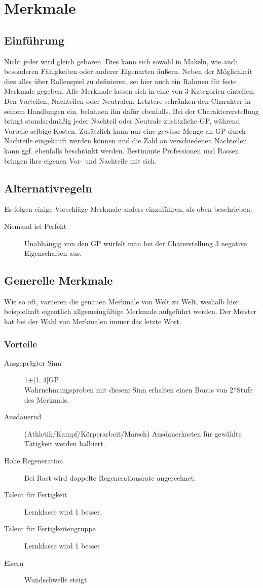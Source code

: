 \documentclass[a4paper,12pt,oneside]{book}
\begin{document}
\chapter{Merkmale}
\section{Einführung}
Nicht jeder wird gleich geboren. Dies kann sich sowohl in Makeln, wie auch besonderen Fähigkeiten oder anderer Eigenarten äußern. Neben der Möglichkeit dies alles über Rollenspiel zu definieren, sei hier auch ein Rahmen für feste Merkmale gegeben. Alle Merkmale lassen sich in eine von 3 Kategorien einteilen: Den Vorteilen, Nachteilen oder Neutralen. Letztere schränken den Charakter in seinem Handlungen ein, belohnen ihn dafür ebenfalls. Bei der Charaktererstellung bringt standardmäßig jeder Nachteil oder Neutrale zusätzliche GP, während Vorteile selbige Kosten. Zusätzlich kann nur eine gewisse Menge an GP durch Nachteile eingekauft werden können und die Zahl an verschiedenen Nachteilen kann ggf. ebenfalls beschränkt werden. Bestimmte Professionen und Rassen bringen ihre eigenen Vor- und Nachteile mit sich.
\section{Alternativregeln}
Es folgen einige Vorschläge Merkmale anders einzuführen, als oben beschrieben:
\begin{description}
\item[Niemand ist Perfekt]Unabhängig von den GP würfelt man bei der Charerstellung 3 negative Eigenschaften aus.
\end{description}
\section{Generelle Merkmale}
Wie so oft, variieren die genauen Merkmale von Welt zu Welt, weshalb hier beispielhaft eigentlich allgemeingültige Merkmale aufgeführt werden. Der Meister hat bei der Wahl von Merkmalen immer das letzte Wort.
\subsection{Vorteile}
\begin{description}
\item[Ausgeprägter Sinn]1+[1..4]GP
\\Wahrnehmungsproben mit diesem Sinn erhalten einen Bonus von 2*Stufe des Merkmals.
\item[Ausdauernd] (Athletik/Kampf/Körperarbeit/Marsch) Ausdauerkosten für gewählte Tätigkeit werden halbiert.
\item[Hohe Regeneration] Bei Rast wird doppelte Regenerationsrate angerechnet.
\item[Talent für Fertigkeit] Lernklasse wird 1 besser.
\item[Talent für Fertigkeitengruppe] Lernklasse wird 1 besser
\item[Eisern] Wundschwelle steigt
\end{description}
\end{document}
